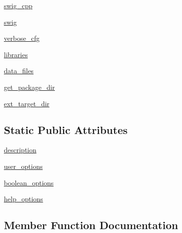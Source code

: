 \begin{DoxyCompactItemize}
\item 
\hyperlink{classnumpy_1_1distutils_1_1command_1_1build__src_1_1build__src_a22e6d804081ef1502901286693234dca}{swig\+\_\+cpp}
\item 
\hyperlink{classnumpy_1_1distutils_1_1command_1_1build__src_1_1build__src_ae0043af65c3dae993fce6ca5746a3b25}{swig}
\item 
\hyperlink{classnumpy_1_1distutils_1_1command_1_1build__src_1_1build__src_a31704ae347b234937e26928ea9f6fdad}{verbose\+\_\+cfg}
\item 
\hyperlink{classnumpy_1_1distutils_1_1command_1_1build__src_1_1build__src_a12e7b5125bb9722084bbcf19897b8040}{libraries}
\item 
\hyperlink{classnumpy_1_1distutils_1_1command_1_1build__src_1_1build__src_a14f366724112c423fac8045066a0c055}{data\+\_\+files}
\item 
\hyperlink{classnumpy_1_1distutils_1_1command_1_1build__src_1_1build__src_a0a3a4a1e0ec4722a24c68e68bbf3e74a}{get\+\_\+package\+\_\+dir}
\item 
\hyperlink{classnumpy_1_1distutils_1_1command_1_1build__src_1_1build__src_ad318309469f88ecb0f18fe66ad96d64f}{ext\+\_\+target\+\_\+dir}
\end{DoxyCompactItemize}
\subsection*{Static Public Attributes}
\begin{DoxyCompactItemize}
\item 
\hyperlink{classnumpy_1_1distutils_1_1command_1_1build__src_1_1build__src_a20328d1ed3e0efb40b23bee680f2292b}{description}
\item 
\hyperlink{classnumpy_1_1distutils_1_1command_1_1build__src_1_1build__src_afaf718a4be6dfbc95a6fa01f1605371b}{user\+\_\+options}
\item 
\hyperlink{classnumpy_1_1distutils_1_1command_1_1build__src_1_1build__src_a0e6f6de98d536e9e32905b274936c61e}{boolean\+\_\+options}
\item 
\hyperlink{classnumpy_1_1distutils_1_1command_1_1build__src_1_1build__src_aedfe4b6a1a1214f2886576f841be9bdf}{help\+\_\+options}
\end{DoxyCompactItemize}


\subsection{Member Function Documentation}
\mbox{\label{classnumpy_1_1distutils_1_1command_1_1build__src_1_1build__src_a77e5fc7595e45ab8e85d1ef001c1bbcc}} 
